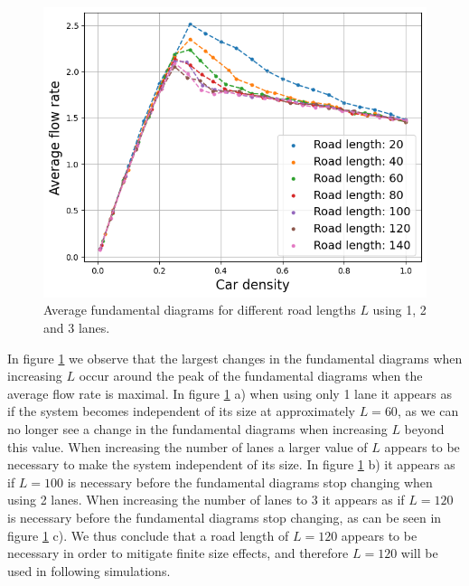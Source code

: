 \documentclass[a4paper,12pt]{article}
\begin{document}
\begin{figure}[H]
\begin{minipage}{.5\textwidth}
        \includegraphics[scale=0.47]{Images/fundamental diagrams 3 lanes 140.png}
    \end{minipage}%
    \caption{Average fundamental diagrams for different road lengths $L$ using 1, 2 and 3 lanes.}
    \label{finite size effects}
\end{figure}

In figure \ref*{finite size effects} we observe that the largest changes in the fundamental diagrams when increasing $L$ occur around the
peak of the fundamental diagrams when the average flow rate is maximal. In figure \ref*{finite size effects} a) when using only 1 lane it appears
as if the system becomes independent of its size at approximately $L=60$, as we can no longer see a change in the fundamental diagrams when increasing
$L$ beyond this value. When increasing the number of lanes a larger value of $L$ appears to be necessary to make the system independent of its size. 
In figure \ref*{finite size effects} b) it appears as if $L=100$ is necessary before the fundamental diagrams stop changing when using 2 lanes. When increasing the number
of lanes to 3 it appears as if $L=120$ is necessary before the fundamental diagrams stop changing, as can be seen in figure \ref*{finite size effects} c).
We thus conclude that a road length of $L=120$ appears to be necessary in order to mitigate finite size effects, and therefore $L=120$ will be used
in following simulations.
\end{document}
